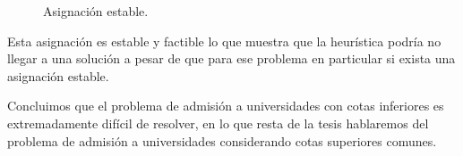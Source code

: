 \begin{eje}
\begin{figure}[H]

\caption{Asignación estable.}
\end{figure}

Esta asignación es estable y factible lo que muestra que la heurística podría no llegar a una solución a pesar de que para ese problema en particular si exista una asignación estable. \fin
\fin
\end{eje}

Concluimos que el problema de admisión a universidades con cotas inferiores es extremadamente difícil de resolver, en lo que resta de la tesis hablaremos del problema de admisión a universidades considerando cotas superiores comunes. 





